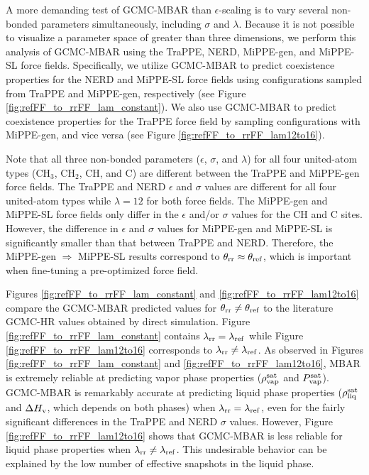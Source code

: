 \documentclass[journal=jced,manuscript=article]{achemso}
\begin{document}
A more demanding test of GCMC-MBAR than $\epsilon$-scaling is to vary several non-bonded parameters simultaneously, including $\sigma$ and $\lambda$. Because it is not possible to visualize a parameter space of greater than three dimensions, we perform this analysis of GCMC-MBAR using the TraPPE, NERD, MiPPE-gen, and MiPPE-SL force fields. Specifically, we utilize GCMC-MBAR to predict coexistence properties for the NERD and MiPPE-SL force fields using configurations sampled from TraPPE and MiPPE-gen, respectively (see Figure \ref{fig:refFF_to_rrFF_lam_constant}). We also use GCMC-MBAR to predict coexistence properties for the TraPPE force field by sampling configurations with MiPPE-gen, and vice versa (see Figure \ref{fig:refFF_to_rrFF_lam12to16}). 

Note that all three non-bonded parameters ($\epsilon$, $\sigma$, and $\lambda$) for all four united-atom types (CH$_3$, CH$_2$, CH, and C) are different between the TraPPE and MiPPE-gen force fields. The TraPPE and NERD $\epsilon$ and $\sigma$ values are different for all four united-atom types while $\lambda = 12$ for both force fields. The MiPPE-gen and MiPPE-SL force fields only differ in the $\epsilon$ and/or $\sigma$ values for the CH and C sites. However, the difference in $\epsilon$ and $\sigma$ values for MiPPE-gen and MiPPE-SL is significantly smaller than that between TraPPE and NERD. Therefore, the MiPPE-gen $\Rightarrow$ MiPPE-SL results correspond to $\theta_{\rm rr} \approx \theta_{\rm ref}$, which is important when fine-tuning a pre-optimized force field.


Figures \ref{fig:refFF_to_rrFF_lam_constant} and \ref{fig:refFF_to_rrFF_lam12to16} compare the GCMC-MBAR predicted values for $\theta_{\rm rr} \neq \theta_{\rm ref}$ to the literature GCMC-HR values obtained by direct simulation. Figure \ref{fig:refFF_to_rrFF_lam_constant} contains $\lambda_{\rm rr} = \lambda_{\rm ref}$ while Figure \ref{fig:refFF_to_rrFF_lam12to16} corresponds to $\lambda_{\rm rr} \neq \lambda_{\rm ref}$. As observed in Figures \ref{fig:refFF_to_rrFF_lam_constant} and \ref{fig:refFF_to_rrFF_lam12to16}, MBAR is extremely reliable at predicting vapor phase properties ($\rho_{\rm vap}^{\rm sat}$ and $P_{\rm vap}^{\rm sat}$). GCMC-MBAR is remarkably accurate at predicting liquid phase properties ($\rho_{\rm liq}^{\rm sat}$ and $\Delta H_{\rm v}$, which depends on both phases) when $\lambda_{\rm rr} = \lambda_{\rm ref}$, even for the fairly significant differences in the TraPPE and NERD $\sigma$ values. However, Figure \ref{fig:refFF_to_rrFF_lam12to16} shows that GCMC-MBAR is less reliable for liquid phase properties when $\lambda_{\rm rr} \neq \lambda_{\rm ref}$. This undesirable behavior can be explained by the low number of effective snapshots in the liquid phase.
\end{document}

